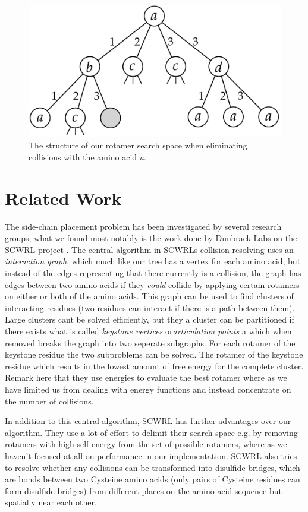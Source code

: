 
\begin{figure}
	\centering
	\includegraphics[width=.9\columnwidth]{figures/rotamersearch}
	\caption{The structure of our rotamer search space when eliminating
      collisions with the amino acid \textit{a}.}
    \label{fig:rotamer-search-tree}
\end{figure}

\section{Related Work}
The side-chain placement problem has been investigated by several
research groups, what we found most notably is the work done by
Dunbrack Labs on the SCWRL project \cite{canutescu2003graph,
  krivov2009improved}. The central algorithm in SCWRLs collision
resolving uses an \textit{interaction graph}, which much like our tree
has a vertex for each amino acid, but instead of the edges
representing that there currently is a collision, the graph has edges
between two amino acids if they \textit{could} collide by applying
certain rotamers on either or both of the amino acids. This graph can
be used to find clusters of interacting residues (two residues can
interact if there is a path between them). Large clusters cant be
solved efficiently, but they a cluster can be partitioned if there
exists what is called \textit{keystone vertices}
or\textit{articulation points} a which when removed breaks the graph
into two seperate subgraphs. For each rotamer of the keystone residue
the two subproblems can be solved. The rotamer of the keystone residue
which results in the lowest amount of free energy for the complete
cluster. Remark here that they use energies to evaluate the best
rotamer where as we have limited us from dealing with energy
functions and instead concentrate on the number of collisions.

In addition to this central algorithm, SCWRL has further advantages
over our algorithm. They use a lot of effort to delimit their search
space e.g. by removing rotamers with high self-energy from the set of
possible rotamers, where as we haven't focused at all on performance
in our implementation. SCWRL also tries to resolve whether any
collisions can be transformed into disulfide bridges, which are bonds
between two Cysteine amino acids (only pairs of Cysteine residues can form
disulfide bridges) from different places on the amino acid sequence
but spatially near each other.

